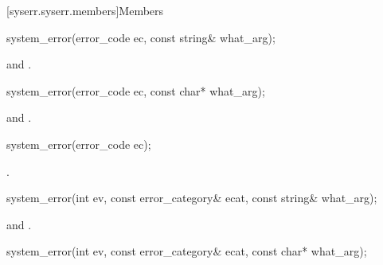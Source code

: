 [syserr.syserr.members]{Members}

%
\begin{itemdecl}
system_error(error_code ec, const string& what_arg);
\end{itemdecl}

\begin{itemdescr}

\pnum
\ensures {} and
.
\end{itemdescr}

%
\begin{itemdecl}
system_error(error_code ec, const char* what_arg);
\end{itemdecl}

\begin{itemdescr}

\pnum
\ensures {} and
.
\end{itemdescr}

%
\begin{itemdecl}
system_error(error_code ec);
\end{itemdecl}

\begin{itemdescr}

\pnum
\ensures {}.
\end{itemdescr}

%
\begin{itemdecl}
system_error(int ev, const error_category& ecat, const string& what_arg);
\end{itemdecl}

\begin{itemdescr}

\pnum
\ensures \raggedright {} and\linebreak
{}.
\end{itemdescr}

%
\begin{itemdecl}
system_error(int ev, const error_category& ecat, const char* what_arg);
\end{itemdecl}


